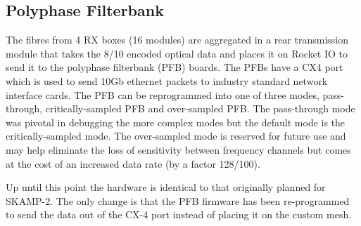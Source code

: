 \subsection{Polyphase Filterbank}
The fibres from 4 RX boxes (16 modules) are aggregated in a rear transmission module that takes the 8/10 encoded optical data and places it on Rocket IO to send it to the polyphase filterbank (PFB) boards. The PFBs have a CX4 port which is used to send 10Gb ethernet packets to industry standard network interface cards. The PFB can be reprogrammed into one of three modes, pass-through, critically-sampled PFB and over-sampled PFB. The pass-through mode was pivotal in debugging the more complex modes but the default mode is the critically-sampled mode. The over-sampled mode is reserved for future use and may help eliminate the loss of sensitivity between frequency channels but comes at the cost of an increased data rate (by a factor 128/100). 

Up until this point the hardware is identical to that originally planned for SKAMP-2. The only change is that the PFB firmware has been re-programmed to send the data out of the CX-4 port instead of placing it on the custom mesh.